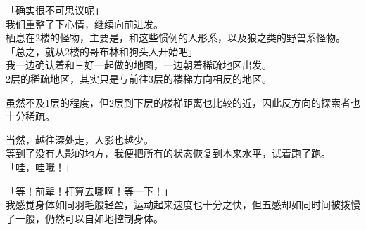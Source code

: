 「确实很不可思议呢」\\

我们重整了下心情，继续向前进发。\\

栖息在2楼的怪物，主要是，和这些惯例的人形系，以及狼之类的野兽系怪物。\\

「总之，就从2楼的哥布林和狗头人开始吧」\\

我一边确认着和三好一起做的地图，一边朝着稀疏地区出发。\\

2层的稀疏地区，其实只是与前往3层的楼梯方向相反的地区。

虽然不及1层的程度，但2层到下层的楼梯距离也比较的近，因此反方向的探索者也十分稀疏。

当然，越往深处走，人影也越少。\\

等到了没有人影的地方，我便把所有的状态恢复到本来水平，试着跑了跑。\\

「哇，哇哦！」

「等！前辈！打算去哪啊！等一下！」\\

我感觉身体如同羽毛般轻盈，运动起来速度也十分之快，但五感却如同时间被拨慢了一般，仍然可以自如地控制身体。\\

